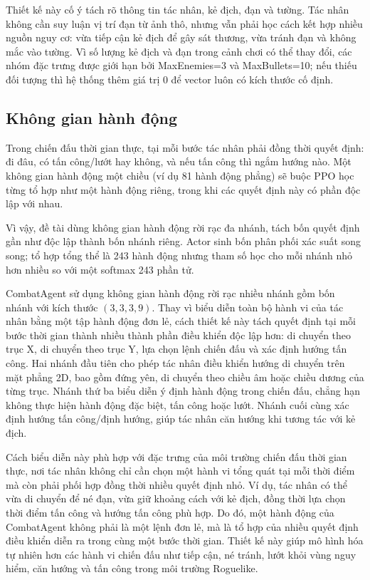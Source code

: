 Thiết kế này cố ý tách rõ thông tin tác nhân, kẻ địch, đạn và tường. Tác nhân không cần suy luận vị trí đạn từ ảnh thô, nhưng vẫn phải học cách kết hợp nhiều nguồn nguy cơ: vừa tiếp cận kẻ địch để gây sát thương, vừa tránh đạn và không mắc vào tường. Vì số lượng kẻ địch và đạn trong cảnh chơi có thể thay đổi, các nhóm đặc trưng được giới hạn bởi MaxEnemies=3 và MaxBullets=10; nếu thiếu đối tượng thì hệ thống thêm giá trị 0 để vector luôn có kích thước cố định.

\subsection{Không gian hành động}

Trong chiến đấu thời gian thực, tại mỗi bước tác nhân phải đồng thời quyết định: đi đâu, có tấn công/lướt hay không, và nếu tấn công thì ngắm hướng nào. Một không gian hành động một chiều (ví dụ 81 hành động phẳng) sẽ buộc PPO học từng tổ hợp như một hành động riêng, trong khi các quyết định này có phần độc lập với nhau.

Vì vậy, đề tài dùng không gian hành động rời rạc đa nhánh, tách bốn quyết định gần như độc lập thành bốn nhánh riêng. Actor sinh bốn phân phối xác suất song song; tổ hợp tổng thể là 243 hành động nhưng tham số học cho mỗi nhánh nhỏ hơn nhiều so với một softmax 243 phần tử.

CombatAgent sử dụng không gian hành động rời rạc nhiều nhánh gồm bốn nhánh với kích thước $(3,3,3,9)$. Thay vì biểu diễn toàn bộ hành vi của tác nhân bằng một tập hành động đơn lẻ, cách thiết kế này tách quyết định tại mỗi bước thời gian thành nhiều thành phần điều khiển độc lập hơn: di chuyển theo trục X, di chuyển theo trục Y, lựa chọn lệnh chiến đấu và xác định hướng tấn công. Hai nhánh đầu tiên cho phép tác nhân điều khiển hướng di chuyển trên mặt phẳng 2D, bao gồm đứng yên, di chuyển theo chiều âm hoặc chiều dương của từng trục. Nhánh thứ ba biểu diễn ý định hành động trong chiến đấu, chẳng hạn không thực hiện hành động đặc biệt, tấn công hoặc lướt. Nhánh cuối cùng xác định hướng tấn công/định hướng, giúp tác nhân căn hướng khi tương tác với kẻ địch.

Cách biểu diễn này phù hợp với đặc trưng của môi trường chiến đấu thời gian thực, nơi tác nhân không chỉ cần chọn một hành vi tổng quát tại mỗi thời điểm mà còn phải phối hợp đồng thời nhiều quyết định nhỏ. Ví dụ, tác nhân có thể vừa di chuyển để né đạn, vừa giữ khoảng cách với kẻ địch, đồng thời lựa chọn thời điểm tấn công và hướng tấn công phù hợp. Do đó, một hành động của CombatAgent không phải là một lệnh đơn lẻ, mà là tổ hợp của nhiều quyết định điều khiển diễn ra trong cùng một bước thời gian. Thiết kế này giúp mô hình hóa tự nhiên hơn các hành vi chiến đấu như tiếp cận, né tránh, lướt khỏi vùng nguy hiểm, căn hướng và tấn công trong môi trường Roguelike.

